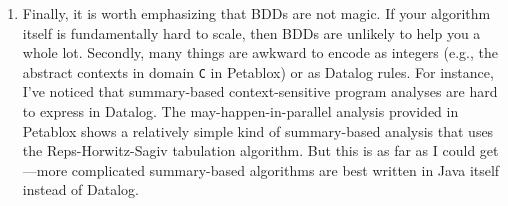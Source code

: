 \begin{enumerate}
\item

Finally, it is worth emphasizing that BDDs are not magic.
If your algorithm itself is fundamentally hard to scale, then BDDs are
unlikely to help you a whole lot.  Secondly, many things are awkward to
encode as integers (e.g., the abstract contexts in domain \verb+C+ 
in Petablox) or as Datalog rules.
For instance, I've noticed that summary-based context-sensitive program
analyses are hard to express in Datalog.  The may-happen-in-parallel
analysis provided in Petablox shows a relatively simple kind of summary-based
analysis that uses the Reps-Horwitz-Sagiv tabulation algorithm.  But this
is as far as I could get---more complicated summary-based algorithms are
best written in Java itself instead of Datalog.
\end{enumerate}

